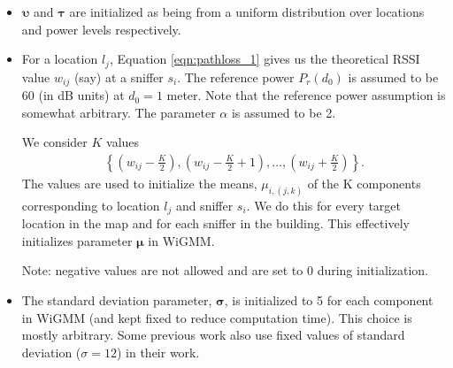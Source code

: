 \begin{itemize}

\item ${\boldsymbol\upsilon}$ and ${\boldsymbol\tau}$ are initialized as being from a uniform distribution over locations and power levels respectively.

\item For a location $l_{j}$, Equation \ref{eqn:pathloss_1} gives us the theoretical RSSI value  $w_{ij}$ (say) at a sniffer $s_{i}$. The reference power $P_r({d_0})$
is assumed to be 60 (in dB units) at $d_0=1$ meter. Note that the reference power
assumption is somewhat arbitrary. The parameter $\alpha$ is assumed to be 2. 

We consider $K$ values
\begin{align}
\left\{ (w_{ij}-\frac{K}{2}), (w_{ij}-\frac{K}{2}+1), \dots ,(w_{ij}+\frac{K}{2})\right\}. \nonumber
\end{align}
The values are used to initialize the means, $\mu_{i, (j,k)}$ of the K components corresponding to location $l_{j}$ and sniffer $s_{i}$. We do this for every target location in the map and for each sniffer in the building. This effectively initializes parameter ${\boldsymbol\mu}$ in WiGMM. 

Note: negative values are not allowed and are set to 0 during initialization.

\item The standard deviation parameter, ${\boldsymbol\sigma}$, is initialized to 5 for each component in WiGMM (and kept fixed to reduce computation time). This choice is mostly arbitrary. Some previous work \cite{Tao:2003:WLL:941311.941314} also use fixed values of standard deviation ($\sigma=12$) in their work. \\

\end{itemize}



